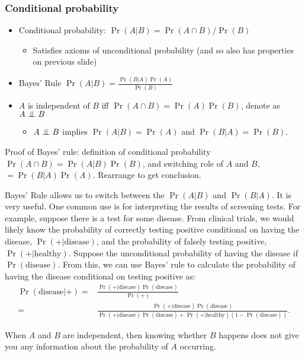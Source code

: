 \begin{frame}[allowframebreaks]\frametitle{Conditional probability}
  \begin{itemize}
  \item \alert{Conditional probability}: $\Pr(A | B) = \Pr(A \cap B) /
    \Pr(B)$ 
    \begin{itemize}
    \item Satisfies axioms of unconditional probability (and so also
      has properties on previous slide)
    \end{itemize}
  \item\alert{Bayes' Rule} $\Pr(A | B ) = \frac{\Pr (B | A) \Pr(A) } {\Pr(B) }$ 
  \item $A$ is \alert{independent} of $B$ iff $\Pr(A \cap B) = \Pr(A) \Pr(B)$,
    denote as $A \indep B$
    \begin{itemize}
    \item $A \indep B$ implies $\Pr(A | B) = \Pr(A)$ and $\Pr(B | A) = 
      \Pr(B)$.
    \end{itemize}
  \end{itemize}    
\end{frame}
Proof of Bayes' rule: definition of conditional probability
$\Pr(A \cap B) = \Pr(A | B) \Pr(B)$, and switching role of $A$
and $B$, $= \Pr(B | A ) \Pr(A)$. Rearrange to get conclusion.

Bayes' Rule allows us to switch between the $\Pr(A|B)$ and
$\Pr(B |A)$. It is very useful. One common use is for
interpreting the results of screening tests. For example,
suppose there is a test for some disease. From clinical trials,
we would likely know the probability of correctly testing positive
conditional on having the disease, $\Pr(+|\mathrm{disease})$,
and the probability of falsely testing positive,
$\Pr(+|\mathrm{healthy})$. Suppose the unconditional probability
of having the disease if $\Pr(\mathrm{disease})$. From this, we
can use Bayes' rule to calculate the probability of having the
disease conditional on testing positive as:
\begin{align*}
  \Pr(\mathrm{disease}|+) = & \frac{\Pr(+|\mathrm{disease})
    \Pr(\mathrm{disease})} {\Pr(+)} \\
  = & \frac{\Pr(+|\mathrm{disease}) \Pr(\mathrm{disease})} 
  {\Pr(+|\mathrm{disease}) \Pr(\mathrm{disease}) +
    \Pr(+|\mathrm{healthy}) (1-\Pr(\mathrm{disease}))}.
\end{align*}

When $A$ and $B$ are independent, then knowing whether $B$ happens
does not give you any information about the probability of $A$
occurring.

